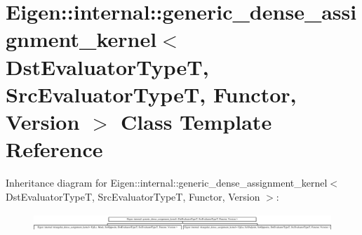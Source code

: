 \hypertarget{class_eigen_1_1internal_1_1generic__dense__assignment__kernel}{}\section{Eigen\+::internal\+::generic\+\_\+dense\+\_\+assignment\+\_\+kernel$<$ Dst\+Evaluator\+TypeT, Src\+Evaluator\+TypeT, Functor, Version $>$ Class Template Reference}
\label{class_eigen_1_1internal_1_1generic__dense__assignment__kernel}
Inheritance diagram for Eigen\+::internal\+::generic\+\_\+dense\+\_\+assignment\+\_\+kernel$<$ Dst\+Evaluator\+TypeT, Src\+Evaluator\+TypeT, Functor, Version $>$\+:\begin{figure}[H]
\begin{center}
\leavevmode
\includegraphics[height=0.657277cm]{class_eigen_1_1internal_1_1generic__dense__assignment__kernel}
\end{center}
\end{figure}
